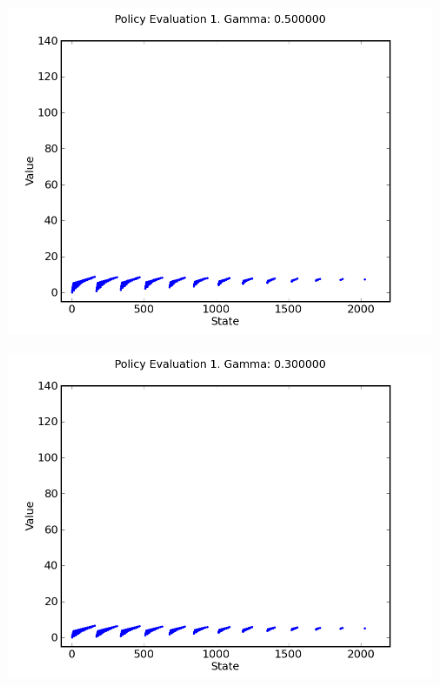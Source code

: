 \documentclass[a4paper]{article}
\begin{document}
\begin{figure}[h]
\center
\includegraphics[scale=0.75]{gamma_iteration/gamma_5_1.png}
\end{figure}

\begin{figure}[h]
\center
\includegraphics[scale=0.75]{gamma_iteration/gamma_3_1.png}
\end{figure}
\end{document}
